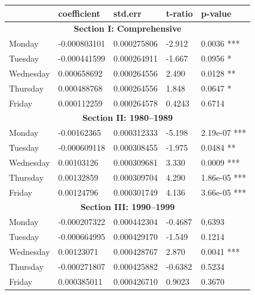 \documentclass[11pt, english]{article}
\begin{document}
	\begin{table}[h]
                \scriptsize
		\renewcommand{\arraystretch}{1.25}
        \begin{center}
        \begin{tabular}{p{2cm}p{2cm}p{2cm}p{2cm}p{2cm}}
                & \textbf{coefficient} & \textbf{std.err} & \textbf{t-ratio} & \textbf{p-value}\\
                \hline
                \multicolumn{5}{c}{\textbf{Section I: Comprehensive}}\\
                \hline
                Monday & -0.000803101 & 0.000275806 & -2.912 & 0.0036 ***\\
                Tuesday & -0.000441599 & 0.000264911 & -1.667 & 0.0956 *\\
                Wednesday & 0.000658692 & 0.000264556 & 2.490 & 0.0128 **\\
                Thursday & 0.000488768 & 0.000264556 & 1.848 & 0.0647 *\\
                Friday & 0.000112259 & 0.000264578 & 0.4243 & 0.6714\\
                \hline
                \multicolumn{5}{c}{\textbf{Section II: 1980--1989}}\\
                \hline            
                Monday & -0.00162365 & 0.000312333 & -5.198 & 2.19e-07 ***\\   
                Tuesday & -0.000609118 & 0.000308455 & -1.975 & 0.0484 **\\  
                Wednesday & 0.00103126 & 0.000309681 & 3.330 & 0.0009 ***\\
                Thursday & 0.00132859 & 0.000309704 & 4.290 & 1.86e-05 ***\\
                Friday & 0.00124796 & 0.000301749 & 4.136 & 3.66e-05 ***\\  
                \hline                                             
                \multicolumn{5}{c}{\textbf{Section III: 1990--1999}}\\
                \hline            
                Monday & -0.000207322 & 0.000442304 & -0.4687 & 0.6393\\   
                Tuesday & -0.000664995 & 0.000429170 & -1.549 & 0.1214\\  
                Wednesday & 0.00123071 & 0.000428767 & 2.870 & 0.0041 ***\\
                Thursday & -0.000271807 & 0.000425882 & -0.6382 & 0.5234\\
                Friday & 0.000385011 & 0.000426710 & 0.9023 & 0.3670\\  

\end{tabular}
\end{center}
\end{table}
\end{document}
